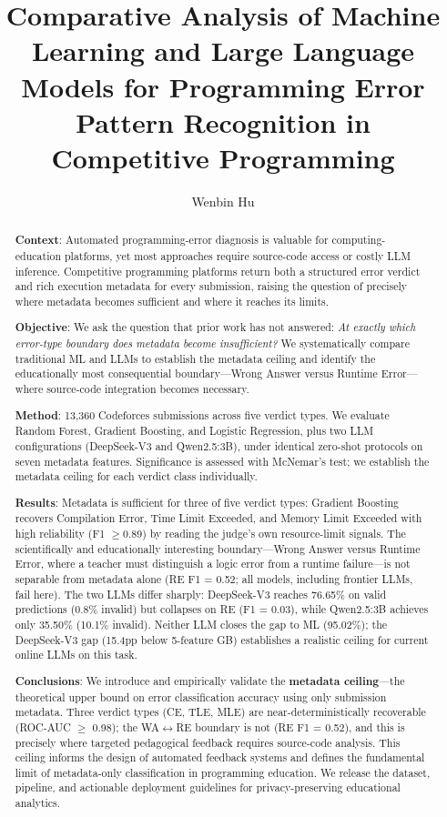 \documentclass[acmsmall]{acmart}
\title{Comparative Analysis of Machine Learning and Large Language Models
       for Programming Error Pattern Recognition in Competitive Programming}
\author{Wenbin Hu}
\affiliation{
  \institution{School of Computer Science, Xijing University}
  \city{Xi'an}
  \country{China}
}
\begin{document}
\begin{abstract}
\noindent\textbf{Context}: Automated programming-error diagnosis is valuable for
computing-education platforms, yet most approaches require source-code access
or costly LLM inference. Competitive programming platforms return both a
structured error verdict and rich execution metadata for every submission,
raising the question of precisely where metadata becomes sufficient and where
it reaches its limits.

\noindent\textbf{Objective}: We ask the question that prior work has not answered:
\textit{At exactly which error-type boundary does metadata become insufficient?}
We systematically compare traditional ML and LLMs to establish the metadata
ceiling and identify the educationally most consequential boundary---Wrong
Answer versus Runtime Error---where source-code integration becomes necessary.

\noindent\textbf{Method}: 13,360 Codeforces submissions across five verdict types.
We evaluate Random Forest, Gradient Boosting, and Logistic Regression, plus two
LLM configurations (DeepSeek-V3 and Qwen2.5:3B), under identical zero-shot
protocols on seven metadata features. Significance is assessed with McNemar's
test; we establish the metadata ceiling for each verdict class individually.

\noindent\textbf{Results}: Metadata is sufficient for three of five verdict types:
Gradient Boosting recovers Compilation Error, Time Limit Exceeded, and Memory
Limit Exceeded with high reliability (F1 $\ge$0.89) by reading the judge's
own resource-limit signals. The scientifically and educationally interesting
boundary---Wrong Answer versus Runtime Error, where a teacher must distinguish
a logic error from a runtime failure---is not separable from metadata alone
(RE F1 = 0.52; all models, including frontier LLMs, fail here). The two LLMs
differ sharply: DeepSeek-V3 reaches 76.65\% on valid predictions (0.8\%
invalid) but collapses on RE (F1 = 0.03), while Qwen2.5:3B achieves only
35.50\% (10.1\% invalid). Neither LLM closes the gap to ML (95.02\%); the
DeepSeek-V3 gap (15.4pp below 5-feature GB) establishes a realistic ceiling for current online
LLMs on this task.

\noindent\textbf{Conclusions}: We introduce and empirically validate the
\textbf{metadata ceiling}---the theoretical upper bound on error classification
accuracy using only submission metadata. Three verdict types (CE, TLE, MLE) are
near-deterministically recoverable (ROC-AUC $\geq$ 0.98); the WA$\leftrightarrow$RE
boundary is not (RE F1 = 0.52), and this is precisely where targeted pedagogical
feedback requires source-code analysis. This ceiling informs the design of
automated feedback systems and defines the fundamental limit of metadata-only
classification in programming education. We release the dataset,
pipeline, and actionable deployment guidelines for privacy-preserving
educational analytics.

\end{abstract}
\end{document}
